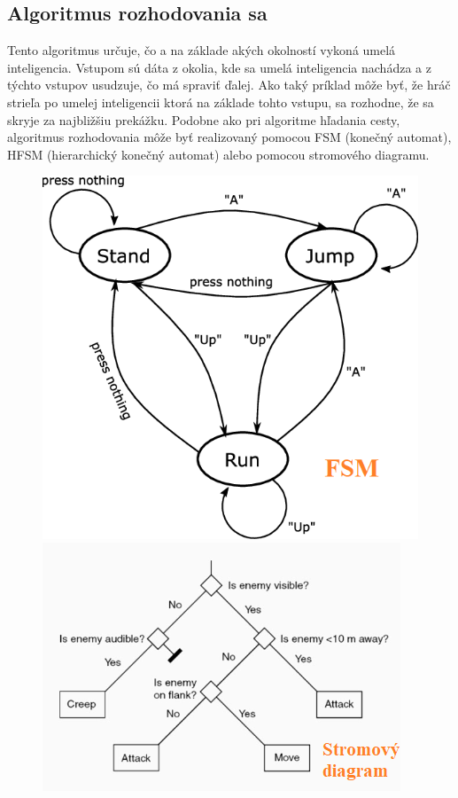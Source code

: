 \documentclass[10pt,oneside,slovak,a4paper]{article}
\begin{document}
\subsection{Algoritmus rozhodovania sa} \label{kapitola3.2}
Tento algoritmus určuje, čo a na základe akých okolností vykoná umelá inteligencia. Vstupom sú dáta z okolia, kde sa umelá inteligencia nachádza a z týchto vstupov usudzuje, čo má spraviť ďalej. Ako taký príklad môže byť, že hráč strieľa po umelej inteligencii ktorá na základe tohto vstupu, sa rozhodne, že sa skryje za najbližšiu prekážku. Podobne ako pri algoritme hľadania cesty, algoritmus rozhodovania môže byť realizovaný pomocou FSM (konečný automat), HFSM (hierarchický konečný automat) alebo pomocou stromového diagramu.
\begin{figure}[tbh]
	\centering
	\includegraphics[scale=0.24]{fsm.png}
	\includegraphics[scale=0.5]{treeDiag.png}

\end{figure}
\end{document}
